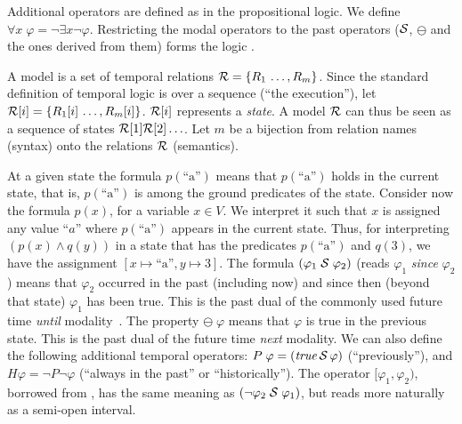 
\noindent 
Additional operators are defined as in the propositional logic. We define
$\forall x \; \varphi = \neg \exists x \neg \varphi$.
Restricting the modal operators to the past operators
(${\cal S}$, $\ominus$ and the ones derived from them) 
forms the logic \PFLTL{}.

A model is a set of temporal
 relations ${\cal R} = \{ R_1 \, \ldots , R_m \}$.
 Since the standard definition of temporal logic is
 over a sequence (``the execution''), let
 ${\cal R} [ i ] = \{ R_1 [ i ] \, \ldots , R_m [ i ] \}$. ${\cal R} [i]$ represents a {\em state}.
 A model ${\cal R}$ can thus be seen as a sequence
 of states ${\cal R}[1] {\cal R}[2] \ldots$. Let 
 $m$ be a bijection
from relation names (syntax)
onto the relations ${\cal R}$ (semantics).


\iffalse
At a given state the formula
$p(\text{``a''})$ means that $p (\text{``a''} )$ holds
in the current state,
that is, $p (\text{``a''} )$ is among 
the ground predicates of the state.
Consider now the formula $p ( x )$, for a variable $x \in V$.
We interpret it such that $x$ is assigned any value ``$a$'' where
$p ( \text{``a''} )$ appears in the current state. 
Thus, for interpreting $(p ( x ) \wedge q ( y ))$ in a state that
has the predicates
$p ( \text{``a''} )$ and $q ( 3 )$,
we have the assignment $[ x \mapsto \text{``a''} , y \mapsto 3 ]$.
The formula $(\varphi_1\; {\cal S}\; \varphi_2)$ 
(reads $\varphi_1$ {\em since} $\varphi_2$)
means that $\varphi_2$ occurred in the past (including now)
and since then (beyond that state) $\varphi_1$ has been true. This is the 
past dual of the commonly used %
future time  {\em until} modality~\cite{MP}. 
The property $\ominus \; \varphi$ means that $\varphi$ is true 
in the previous state.
This is the past dual of the %
future time {\em next} modality.
We can also define the following additional temporal operators:
$P \; \varphi = (\mathit{true} \, {\cal S} \, \varphi)$ (``previously''),
and $H \varphi = \neg P \neg \varphi$ (``always in the past'' or ``historically'').
The operator $[\varphi_1,\varphi_2)$, borrowed from \cite{MaC}, 
has the same meaning as $(\neg \varphi_2\; {\cal S}\; \varphi_1)$, but reads more naturally as
a semi-open interval. 



